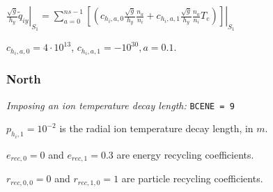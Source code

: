 \documentclass[a4paper,10pt]{report}
\begin{document}
$\left. \frac{\sqrt g}{h_y} \widetilde q_{iy} \right|_{S_1} =
\sum \limits_{a=0}^{ns-1}
\left. \left[
	\left(
		c_{h_i,a,0} \frac{\sqrt g}{h_y} \frac{n_a}{n_i}
		+
		c_{h_i,a,1} \frac{\sqrt g}{h_y} \frac{n_a}{n_i} T_e
	\right)
\right] \right|_{S_1}$

$c_{h_i,a,0} = 4 \cdot 10^{13}$, $c_{h_i,a,1} = -10^{30}, a=0.1$.

\subsubsection{North}

{\em Imposing an ion temperature decay length:} {\tt BCENE = 9}

$p_{h_i,1} = 10^{-2}$ is the radial ion temperature decay length, in $m$.

$e_{rec,0} = 0$ and $e_{rec,1} = 0.3$ are energy recycling coefficients.

$r_{rec,0,0} = 0$ and $r_{rec,1,0} = 1$ are particle recycling coefficients.
\end{document}
